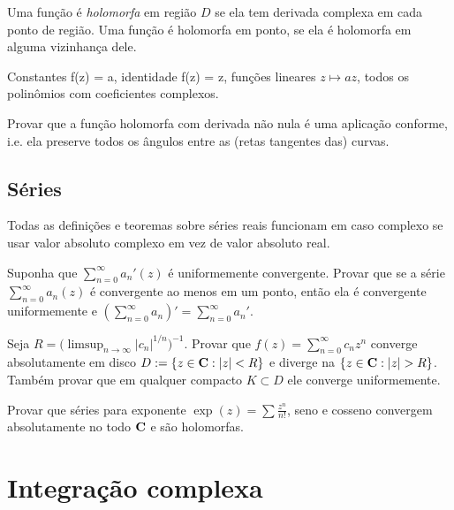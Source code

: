 \begin{defin} Uma função é \emph{holomorfa} em região $D$ se ela tem derivada complexa em cada ponto de região.
Uma função é holomorfa em ponto, se ela é holomorfa em alguma vizinhança dele.
\end{defin}

\begin{exem}
Constantes f(z) = a,
identidade f(z) = z,
funções lineares $z \mapsto a z$,
todos os polinômios com coeficientes complexos.
\end{exem}

\begin{problema}
Provar que a função holomorfa com derivada não nula é uma aplicação conforme,
i.e. ela preserve todos os ângulos entre as (retas tangentes das) curvas.
\end{problema}


\subsection{Séries}

Todas as definições e teoremas sobre séries reais funcionam em caso complexo
se usar valor absoluto complexo em vez de valor absoluto real.

\begin{problema}
Suponha que $\sum_{n=0}^\infty a_n'(z)$ é uniformemente convergente.
Provar que se a série $\sum_{n=0}^\infty a_n(z)$ é convergente ao menos em um ponto,
então ela é convergente uniformemente e $(\sum_{n=0}^\infty a_n)' = \sum_{n=0}^\infty a_n'$.
\end{problema}

\begin{problema}
Seja $R = \big(\limsup_{n\to\infty} |c_n|^{1/n}\big)^{-1}$. Provar que $f(z) = \sum_{n=0}^\infty c_n z^n$
converge absolutamente em disco $D := \{z\in\mathbf{C}: |z|<R\}$ e diverge na $\{z\in\mathbf{C}: |z| >R\}$.
Também provar que em qualquer compacto $K\subset D$ ele converge uniformemente.
\end{problema}

\begin{problema}
Provar que séries para exponente $\exp(z) = \sum \frac{z^n}{n!}$,
seno e cosseno convergem absolutamente no todo $\mathbf{C}$ e são holomorfas.

\end{problema}

\section{Integração complexa}

